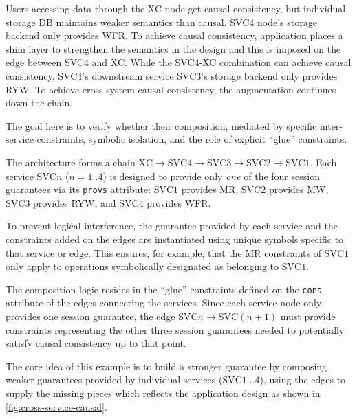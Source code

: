 Users accessing data through the XC node get causal consistency,
but individual storage DB maintains weaker semantics than causal.
SVC4 node's storage backend only provides WFR. To achieve causal
consistency, application places a shim layer to strengthen the semantics
in the design and this is imposed on the edge between SVC4 and XC.
While the SVC4-XC combination can achieve causal consistency, SVC4's
downstream service SVC3's storage backend only provides RYW. To achieve
cross-system causal consistency, the augmentation continues down the chain.


The goal here is to verify whether their composition, mediated by specific
inter-service
constraints, symbolic isolation, and the role of explicit ``glue'' constraints.

 The architecture forms a chain $\text{XC} \rightarrow
\text{SVC4} \rightarrow \text{SVC3} \rightarrow \text{SVC2}
\rightarrow \text{SVC1}$.
Each service $\text{SVC}n$ ($n=1..4$) is designed to provide only
\textit{one} of the
four session guarantees via its \texttt{provs} attribute:
$\text{SVC}1$ provides MR, $\text{SVC}2$ provides
MW, $\text{SVC}3$ provides RYW, and $\text{SVC}4$ provides WFR.

To prevent logical interference, the guarantee provided by
each service and the constraints added on the edges are instantiated
using unique
symbols specific to that service or edge.
This ensures, for example, that the MR constraints of
$\text{SVC}1$ only apply to operations symbolically designated as belonging to
$\text{SVC}1$.

The composition logic resides in the ``glue''
constraints defined on the \texttt{cons} attribute of the edges connecting the
services. Since each service node only provides one session
guarantee, the edge $\text{SVC}n \rightarrow \text{SVC}(n+1)$ must
provide constraints representing the other three session guarantees needed to
potentially satisfy causal consistency up to that point.

The core idea of this example is to build a stronger guarantee by composing
weaker guarantees provided by individual services ($\text{SVC}1
\ldots 4$), using
the edges to supply the missing pieces which reflects the application design
as shown in \cref{fig:cross-service-causal}.

